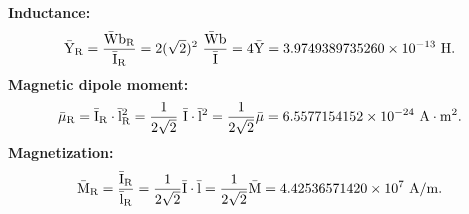 \documentclass[12pt,a4paper,twoside]{report}
\def\baryry{3.9749389735260\times 10^{-13}}
\def\barmury{6.5577154152\times 10^{-24}}
\def\barmagry{4.42536571420\times 10^{7}}
\begin{document}
{{\begin{equation}
\end{equation}
{\bf Inductance:}
\begin{equation}
{\rm \bar Y_R}={{\rm \bar Wb_R} \over {\rm \bar I_R} }= 2 (\sqrt{2})^2\ {{\rm \bar Wb} \over {\rm \bar I}}
= 4 {\rm \bar Y}=\baryry\ {\rm H}.
\end{equation}
{\bf Magnetic dipole moment:}
\begin{equation}
{\rm \bar \mu_R}={{\rm \bar I_R}\cdot {\rm \bar l_R}^2}= {1\over 2\sqrt{2}}\ {{\rm \bar I}\cdot {\rm \bar l}^2}
= {1\over 2\sqrt{2}} {\rm \bar \mu}=\barmury\ {\rm A}\cdot {\rm m}^2.
\end{equation}
{\bf Magnetization:}
\begin{equation}
{\rm \bar M_R}={{\rm \bar I_R} \over {\rm \bar l_R}}= {1\over 2\sqrt{2}} {{\rm \bar I}\cdot {\rm \bar l}}
= {1\over 2\sqrt{2}} {\rm \bar M}=\barmagry\ {\rm A}/{\rm m}.
\end{equation}

}}
\end{document}
